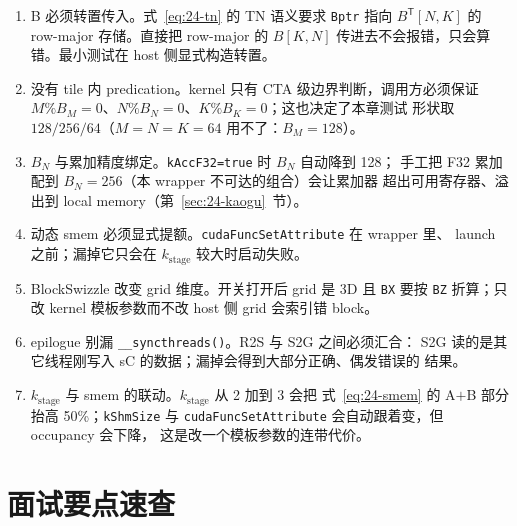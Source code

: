 \begin{enumerate}
  \item B 必须转置传入。式~\eqref{eq:24-tn} 的 TN 语义要求 \texttt{Bptr} 指向
        $B^{\mathsf T}[N,K]$ 的 row-major 存储。直接把 row-major 的 $B[K,N]$
        传进去不会报错，只会算错。最小测试在 host 侧显式构造转置。
  \item 没有 tile 内 predication。kernel 只有 CTA 级边界判断，调用方必须保证
        $M \% B_M = 0$、$N \% B_N = 0$、$K \% B_K = 0$；这也决定了本章测试
        形状取 $128/256/64$（$M=N=K=64$ 用不了：$B_M=128$）。
  \item $B_N$ 与累加精度绑定。\texttt{k\allowbreak{}Acc\allowbreak{}F32=\allowbreak{}true} 时 $B_N$ 自动降到 128；
        手工把 F32 累加配到 $B_N=256$（本 wrapper 不可达的组合）会让累加器
        超出可用寄存器、溢出到 local memory（第~\ref{sec:24-kaogu}~节）。
  \item 动态 smem 必须显式提额。\texttt{cuda\allowbreak{}Func\allowbreak{}Set\allowbreak{}Attribute} 在 wrapper 里、
        launch 之前；漏掉它只会在 $k_{\mathrm{stage}}$ 较大时启动失败。
  \item BlockSwizzle 改变 grid 维度。开关打开后 grid 是 3D 且 \texttt{BX} 要按
        \texttt{BZ} 折算；只改 kernel 模板参数而不改 host 侧 grid 会索引错 block。
  \item epilogue 别漏 \texttt{\_\allowbreak{}\_\allowbreak{}syncthreads\allowbreak{}()}。R2S 与 S2G 之间必须汇合：
        S2G 读的是其它线程刚写入 sC 的数据；漏掉会得到大部分正确、偶发错误的
        结果。
  \item $k_{\mathrm{stage}}$ 与 smem 的联动。$k_{\mathrm{stage}}$ 从 2 加到 3 会把
        式~\eqref{eq:24-smem} 的 A$+$B 部分抬高 50\%；\texttt{kShmSize} 与
        \texttt{cuda\allowbreak{}Func\allowbreak{}Set\allowbreak{}Attribute} 会自动跟着变，但 occupancy 会下降，
        这是改一个模板参数的连带代价。
\end{enumerate}

\section{面试要点速查}

